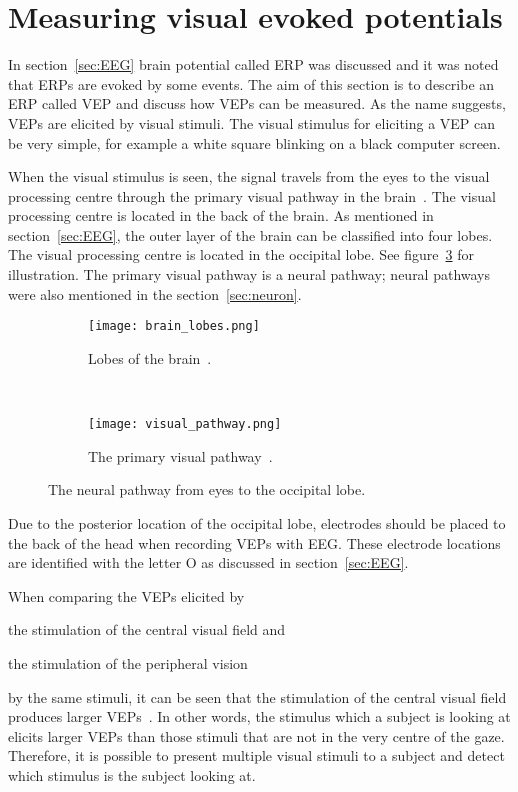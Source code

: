 \section{Measuring visual evoked potentials}
\label{sec:VEP}

In section~\ref{sec:EEG} brain potential called \gls{ERP} was discussed and it was noted that \glspl{ERP} are evoked by some events. The aim of this section is to describe an \gls{ERP} called \gls{VEP} and discuss how \glspl{VEP} can be measured. As the name suggests, \glspl{VEP} are elicited by visual stimuli. The visual stimulus for eliciting a \gls{VEP} can be very simple, for example a white square blinking on a black computer screen.

When the visual stimulus is seen, the signal travels from the eyes to the \gls{visual processing centre} through the \gls{primary visual pathway} in the brain~\cite{neuroscience}. The \gls{visual processing centre} is located in the back of the brain. As mentioned in section~\ref{sec:EEG}, the outer layer of the brain can be classified into four lobes. The \gls{visual processing centre} is located in the occipital lobe. See figure~\ref{fig:lobes_pathway} for illustration. The \gls{primary visual pathway} is a \gls{neural pathway}; \glspl{neural pathway} were also mentioned in the section~\ref{sec:neuron}.

\begin{figure}[h!]
	\centering
	\begin{subfigure}{0.48\textwidth}
		\texttt{[image: brain\_lobes.png]}
		\caption{Lobes of the brain~\cite{blausen}.}
		\label{fig:brain_lobes}
	\end{subfigure}
	~
	\begin{subfigure}{0.48\textwidth}
		\texttt{[image: visual\_pathway.png]}
		\caption{The primary visual pathway~\cite[p.~261]{neuroscience}.}
		\label{fig:visual_pathway}
	\end{subfigure}
	\caption{The neural pathway from eyes to the occipital lobe.}
	\label{fig:lobes_pathway}
\end{figure}

Due to the posterior location of the occipital lobe, electrodes should be placed to the back of the head when recording \glspl{VEP} with \gls{EEG}. These electrode locations are identified with the letter O as discussed in section~\ref{sec:EEG}.

When comparing the \glspl{VEP} elicited by
\begin{enumerate*}[(1)]
	\item the stimulation of the \gls{central visual field} and
	\item the stimulation of the \gls{peripheral vision}
\end{enumerate*} by the same stimuli, it can be seen that the stimulation of the \gls{central visual field} produces larger \glspl{VEP}~\cite{VEP_size}. In other words, the stimulus which a subject is looking at elicits larger \glspl{VEP} than those stimuli that are not in the very centre of the gaze. Therefore, it is possible to present multiple visual stimuli to a subject and detect which stimulus is the subject looking at. 

